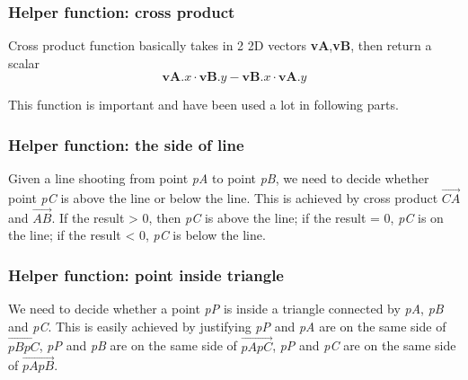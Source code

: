 \documentclass[acmtog]{acmart}
\begin{document}
\subsubsection{Helper function: cross product}
Cross product function basically takes in 2 2D vectors 
\textbf {vA},\textbf {vB}, then return a scalar
\begin{equation} 
\boldsymbol {vA}.x \cdot 
\boldsymbol {vB}.y - 
\boldsymbol {vB}.x \cdot 
\boldsymbol {vA}.y
\end{equation} 

This function is important and have been used a lot in following parts. 

\subsubsection{Helper function: the side of line}
Given a line shooting from point \emph{pA} to point \emph{pB}, we need to decide whether point \emph{pC} is above the line or below the line. This is achieved by cross product $\overrightarrow{CA}$ and $\overrightarrow{AB}$. If the result > 0, then \emph{pC} is above the line; if the result = 0, \emph{pC} is on the line; if the result < 0, \emph{pC} is below the line.

\subsubsection{Helper function: point inside triangle}
We need to decide whether a point \emph{pP} is inside a triangle connected by \emph{pA}, \emph{pB} and \emph{pC}. This is easily achieved by justifying \emph{pP} and \emph{pA} are on the same side of $\overrightarrow{pBpC}$, \emph{pP} and \emph{pB} are on the same side of $\overrightarrow{pApC}$, \emph{pP} and \emph{pC} are on the same side of $\overrightarrow{pApB}$.
\end{document}

